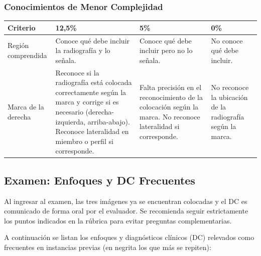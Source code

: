 	\newpage
	
	\subsubsection*{Conocimientos de Menor Complejidad}
	
	\begin{table}[h]
		\centering
		\renewcommand{\arraystretch}{1.5}
		\begin{tabular}{|p{3cm}|p{4.5cm}|p{4.5cm}|p{3.5cm}|}
			\hline
			\textbf{Criterio} & \textbf{12,5\%} & \textbf{5\%} & \textbf{0\%} \\
			\hline
			Región comprendida &
			Conoce qué debe incluir la radiografía y lo señala. &
			Conoce qué debe incluir pero no lo señala. &
			No conoce qué debe incluir. \\
			\hline
			Marca de la derecha &
			Reconoce si la radiografía está colocada correctamente según la marca y corrige si es necesario (derecha-izquierda, arriba-abajo). Reconoce lateralidad en miembro o perfil si corresponde. &
			Falta precisión en el reconocimiento de la colocación según la marca. No reconoce lateralidad si corresponde. &
			No reconoce la ubicación de la radiografía según la marca. \\
			\hline
		\end{tabular}
	\end{table}
	
	\clearpage
	
	\subsection{Examen: Enfoques y DC Frecuentes}
	
	Al ingresar al examen, las tres imágenes ya se encuentran colocadas y el DC es
	comunicado de forma oral por el evaluador. Se recomienda seguir estrictamente los
	puntos indicados en la rúbrica para evitar preguntas complementarias.
	
	A continuación se listan los enfoques y diagnósticos clínicos (DC) relevados como
	frecuentes en instancias previas (en negrita los que más se repiten):
	
